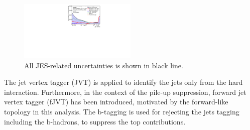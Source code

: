 \begin{figure}[tbp]
    \begin{center}
    \includegraphics[width=0.5\textwidth,keepaspectratio]{figures/Reconstruction/allJES}
    \caption{
    All JES-related uncertainties is shown in black line. \cite{JETM-2018-05}
    }
    \label{fig:in-situcalibration}
    \end{center}
\end{figure}
The jet vertex tagger (JVT) is applied to identify the jets only from the hard interaction. 
Furthermore, in the context of the pile-up suppression, forward jet vertex tagger (fJVT) has been introduced, motivated by the forward-like topology in this analysis.
The b-tagging is used for rejecting the jets tagging including the b-hadrons, to suppress the top contributions.
